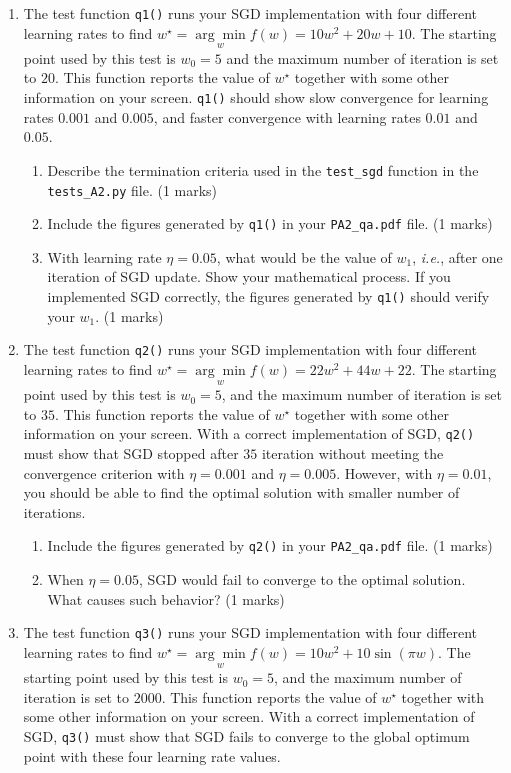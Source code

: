 \documentclass{article}
\theoremstyle{definition}
\begin{document}
\begin{enumerate}[label=\ref{partsgd}.\alph*]
	\item \label{q1q1q1q}The test function \verb|q1()| runs your SGD implementation with four different learning rates to find $w^\star = \underset{w}{\arg \min} f(w) = 10w^2 + 20w + 10$. The starting point used by this test is $w_0=5$ and the maximum number of iteration is set to $20$. This function reports the value of $w^\star$ together with some other information on your screen. \verb|q1()| should show slow convergence for learning rates $0.001$ and $0.005$, and faster convergence with learning rates $0.01$ and $0.05$.
	\begin{enumerate}[label=\ref{q1q1q1q}.\roman*]
		\item Describe the termination criteria used in the \verb|test_sgd| function in the \verb|tests_A2.py| file. (1 marks)
		\item Include the figures generated by \verb|q1()| in your \verb|PA2_qa.pdf| file. (1 marks)
		\item With learning rate $\eta=0.05$, what would be the value of $w_1$, \textit{i.e.}, after one iteration of SGD update. Show your mathematical process. If you implemented SGD correctly, the figures generated by \verb|q1()| should verify your $w_1$. (1 marks)
	\end{enumerate}
	\item \label{q1q1q}The test function \verb|q2()| runs your SGD implementation with four different learning rates to find $w^\star = \underset{w}{\arg \min} f(w) = 22w^2 + 44w + 22$. The starting point used by this test is $w_0=5$, and the maximum number of iteration is set to $35$. This function reports the value of $w^\star$ together with some other information on your screen. With a correct implementation of SGD, \verb|q2()| must show that SGD stopped after $35$ iteration without meeting the convergence criterion with $\eta=0.001$ and $\eta=0.005$. However, with $\eta = 0.01$, you should be able to find the optimal solution with smaller number of iterations.
	\begin{enumerate}[label=\ref{q1q1q}.\roman*]
		\item Include the figures generated by \verb|q2()| in your \verb|PA2_qa.pdf| file. (1 marks)
		\item When $\eta=0.05$, SGD would fail to converge to the optimal solution. What causes such behavior? (1 marks)
	\end{enumerate}
	\item \label{b1b1b}The test function \verb|q3()| runs your SGD implementation with four different learning rates to find $w^\star = \underset{w}{\arg \min} f(w) = 10w^2 + 10\sin(\pi w)$. The starting point used by this test is $w_0=5$, and the maximum number of iteration is set to $2000$. This function reports the value of $w^\star$ together with some other information on your screen. With a correct implementation of SGD, \verb|q3()| must show that SGD fails to converge to the global optimum point with these four learning rate values.

\end{enumerate}
\end{document}
